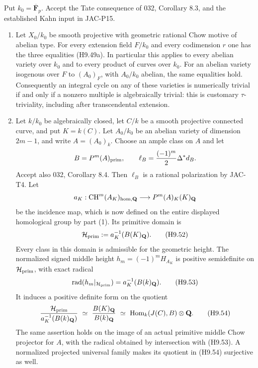 \begin{theorem}[H9-T14]\label{h9:T14}
Put $k_0=\overline{\mathbf F}_p$. Accept the Tate consequence of
032, Corollary 8.3, and the established Kahn input in JAC-P15.

\begin{enumerate}
\item
Let $X_0/k_0$ be smooth projective with geometric rational Chow
motive of abelian type. For every extension field $F/k_0$ and every
codimension $r$ one has the three equalities (H9.49a). In particular
this applies to every
abelian variety over $k_0$ and to every product of curves over $k_0$.
For an abelian variety isogenous over $F$ to $(A_0)_F$, with
$A_0/k_0$ abelian, the same equalities hold. Consequently an integral
cycle on any of these varieties is numerically trivial if and only
if a nonzero multiple is algebraically trivial: this is customary
$\tau$-triviality, including after transcendental extension.

\item
Let $k/k_0$ be algebraically closed, let $C/k$ be a smooth projective
connected curve, and put $K=k(C)$. Let $A_0/k_0$ be an abelian
variety of dimension $2m-1$, and write $A=(A_0)_k$. Choose an ample
class on $A$ and let
\[
 B=P^m(A)_{\rm prim},\qquad
 \ell_B=\frac{(-1)^m}{2}\Delta^*d_B.
\]
Accept also 032, Corollary 8.4. Then $\ell_B$ is a rational
polarization by JAC-T4. Let
\[
 a_K:\operatorname{CH}^m(A_K)_{\rm hom,\mathbf Q}
          \longrightarrow P^m(A)_K(K)_{\mathbf Q}
\]
be the incidence map, which is now defined on the entire displayed
homological group by part (1). Its primitive domain is
\[
 \mathcal H_{\rm prim}
   :=a_K^{-1}(B(K)_{\mathbf Q}).
                                                               \tag{H9.52}
\]
Every class in this domain is admissible for the geometric height.
The normalized signed middle height
$h_m=(-1)^m H_{A_K}$ is positive semidefinite on
$\mathcal H_{\rm prim}$, with exact radical
\[
 \operatorname{rad}(h_m|_{\mathcal H_{\rm prim}})
      =a_K^{-1}(B(k)_{\mathbf Q}).                           \tag{H9.53}
\]
It induces a positive definite form on the quotient
\[
 \frac{\mathcal H_{\rm prim}}
       {a_K^{-1}(B(k)_{\mathbf Q})}
      \ \simeq\
 \frac{B(K)_{\mathbf Q}}{B(k)_{\mathbf Q}}
      \ \simeq\
 \operatorname{Hom}_k(J(C),B)\otimes\mathbf Q.               \tag{H9.54}
\]
The same assertion holds on the image of an actual primitive middle
Chow projector for $A$, with the radical obtained by intersection
with (H9.53). A normalized projected universal family makes its
quotient in (H9.54) surjective as well.
\end{enumerate}
\end{theorem}

